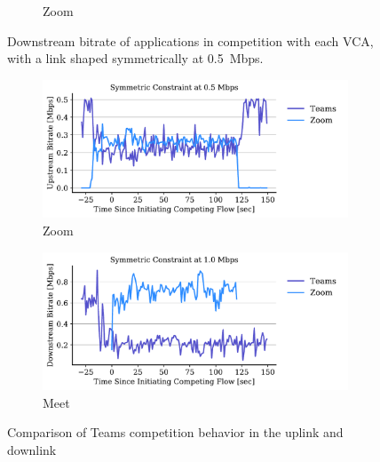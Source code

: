 \begin{figure}[t!]
\begin{subfigure}[t]{.33\textwidth}
    \caption{Zoom}
    \label{fig:zoom-dl-boxplot-0.5}
\end{subfigure}
\caption{Downstream bitrate of applications in competition with each VCA, with a link shaped symmetrically at 0.5~Mbps.}
\label{fig:dnld-boxplot}
\end{figure}

\begin{figure}[t!]
\centering
\begin{subfigure}[t]{.5\textwidth}
    \centering
    \includegraphics[width=1\textwidth]{figures/comp/teams_vs_zoom_up_1.pdf}
    \caption{Zoom}
    \label{fig:teams-zoom-up-1}
\end{subfigure}\hfill
\begin{subfigure}[t]{.5\textwidth}
    \centering
    \includegraphics[width=1\textwidth]{figures/comp/teams_vs_zoom_down_1.pdf}
    \caption{Meet}
    \label{fig:teams-zoom-down-1}
\end{subfigure}
\caption{Comparison of Teams competition behavior in the uplink and downlink}
\label{fig:teams-zoom-1}
\end{figure}


